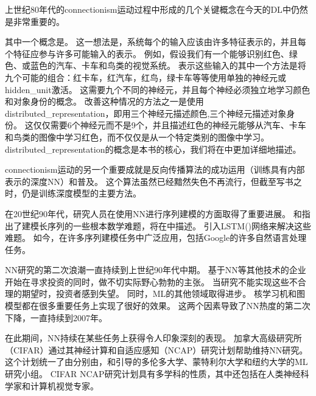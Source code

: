 上世纪80年代的\gls{connectionism}运动过程中形成的几个关键概念在今天的\gls{DL}中仍然是非常重要的。

其中一个概念是\citep{Hinton-et-al-PDP1986}。
这一想法是，系统每个的输入应该由许多特征表示的，并且每个特征应参与许多可能输入的表示。
例如，假设我们有一个能够识别红色、绿色、或蓝色的汽车、卡车和鸟类的视觉系统。
表示这些输入的其中一个方法是将九个可能的组合：红卡车，红汽车，红鸟，绿卡车等等使用单独的神经元或\gls{hidden_unit}激活。
这需要九个不同的神经元，并且每个神经必须独立地学习颜色和对象身份的概念。
改善这种情况的方法之一是使用\gls{distributed_representation}，即用三个神经元描述颜色,三个神经元描述对象身份。 
这仅仅需要6个神经元而不是9个，并且描述红色的神经元能够从汽车、卡车和鸟类的图像中学习红色，而不仅仅是从一个特定类别的图像中学习。 
\gls{distributed_representation}的概念是本书的核心，我们将在中更加详细地描述。


\gls{connectionism}运动的另一个重要成就是反向传播算法的成功运用（训练具有内部表示的深度\gls{NN}）和普及\citep{RHW,Lecun-these87}。
这个算法虽然已经黯然失色不再流行，但截至写书之时，仍是训练深度模型的主要方法。

在20世纪90年代，研究人员在使用\gls{NN}进行序列建模的方面取得了重要进展。
\citet{Hochreiter91}和\citet{Bengio1994ITNN}指出了建模长序列的一些根本数学难题，将在中描述。
\citet{Hochreiter+Schmidhuber-1997}引入\gls{LSTM}()网络来解决这些难题。
如今，在许多序列建模任务中广泛应用，包括Google的许多自然语言处理任务。

\gls{NN}研究的第二次浪潮一直持续到上世纪90年代中期。
基于\gls{NN}等其他技术的企业开始在寻求投资的同时，做不切实际野心勃勃的主张。
当研究不能实现这些不合理的期望时，投资者感到失望。
同时，\gls{ML}的其他领域取得进步。
核学习机\citep{Boser92,Cortes95,SchBurSmo99}和图模型\citep{Jordan98}都在很多重要任务上实现了很好的效果。
这两个因素导致了\gls{NN}热度的第二次下降，一直持续到2007年。

在此期间，\gls{NN}持续在某些任务上获得令人印象深刻的表现\citep{LeCun98-small,Bengio-nnlm2001}。
加拿大高级研究所（CIFAR）通过其神经计算和自适应感知（NCAP）研究计划帮助维持\gls{NN}研究。
这个计划统一了由分别由，和引导的多伦多大学、蒙特利尔大学和纽约大学的\gls{ML}研究小组。
CIFAR NCAP研究计划具有多学科的性质，其中还包括在人类神经科学家和计算机视觉专家。

